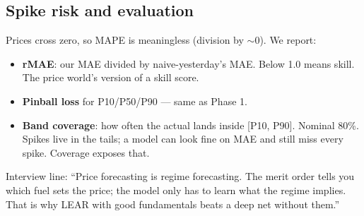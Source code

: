 \subsection{Spike risk and evaluation}

Prices cross zero, so MAPE is meaningless (division by $\sim$0). We report:
\begin{itemize}
  \item \textbf{rMAE}: our MAE divided by naive-yesterday's MAE. Below 1.0
        means skill. The price world's version of a skill score.
  \item \textbf{Pinball loss} for P10/P50/P90 --- same as Phase 1.
  \item \textbf{Band coverage}: how often the actual lands inside
        [P10, P90]. Nominal 80\%. Spikes live in the tails; a model can
        look fine on MAE and still miss every spike. Coverage exposes that.
\end{itemize}

Interview line: ``Price forecasting is regime forecasting. The merit order
tells you which fuel sets the price; the model only has to learn what the
regime implies. That is why LEAR with good fundamentals beats a deep net
without them.''
